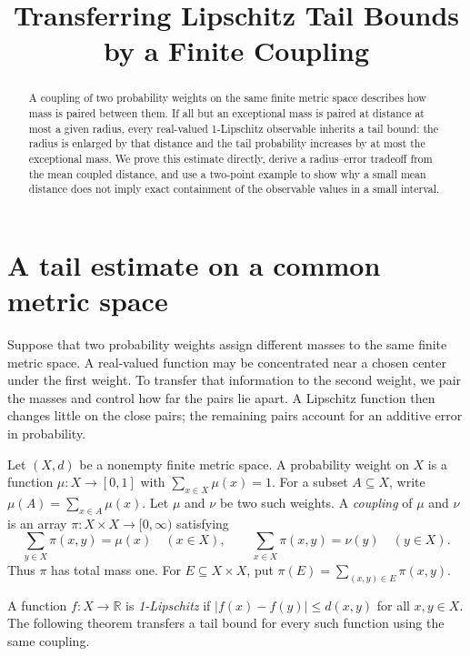 \documentclass[a4paper,11pt]{article}
\title{Transferring Lipschitz Tail Bounds by a Finite Coupling}
\author{}
\date{}
\begin{document}
\maketitle

\begin{abstract}
A coupling of two probability weights on the same finite metric space
describes how mass is paired between them. If all but an exceptional mass
is paired at distance at most a given radius, every real-valued
1-Lipschitz observable inherits a tail bound: the radius is enlarged by
that distance and the tail probability increases by at most the
exceptional mass. We prove this estimate directly, derive a radius--error
tradeoff from the mean coupled distance, and use a two-point example to
show why a small mean distance does not imply exact containment of the
observable values in a small interval.
\end{abstract}

\section{A tail estimate on a common metric space}

Suppose that two probability weights assign different masses to the same
finite metric space. A real-valued function may be concentrated near a
chosen center under the first weight. To transfer that information to the
second weight, we pair the masses and control how far the pairs lie
apart. A Lipschitz function then changes little on the close pairs; the
remaining pairs account for an additive error in probability.

Let $(X,d)$ be a nonempty finite metric space. A probability weight on
$X$ is a function $\mu:X\to[0,1]$ with
$\sum_{x\in X}\mu(x)=1$. For a subset $A\subseteq X$, write
$\mu(A)=\sum_{x\in A}\mu(x)$. Let $\mu$ and $\nu$ be two such weights.
A \emph{coupling} of $\mu$ and $\nu$ is an array
$\pi:X\times X\to[0,\infty)$ satisfying
\begin{equation}\label{eq:marginals}
 \sum_{y\in X}\pi(x,y)=\mu(x)\quad(x\in X),
 \qquad
 \sum_{x\in X}\pi(x,y)=\nu(y)\quad(y\in X).
\end{equation}
Thus $\pi$ has total mass one. For $E\subseteq X\times X$, put
$\pi(E)=\sum_{(x,y)\in E}\pi(x,y)$.

A function $f:X\to\mathbb R$ is \emph{1-Lipschitz} if
$|f(x)-f(y)|\le d(x,y)$ for all $x,y\in X$. The following theorem
transfers a tail bound for every such function using the same coupling.
\end{document}
